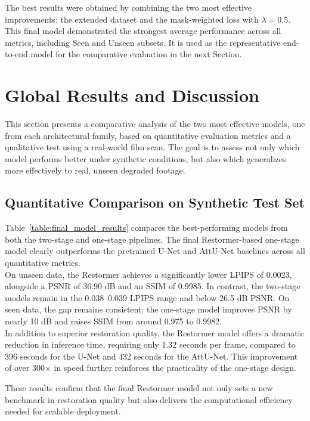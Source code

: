 \documentclass[10pt,a4paper,twocolumn,twoside]{article}
\begin{document}
The best results were obtained by combining the two most effective improvements: the extended dataset and the mask-weighted loss with $\lambda = 0.5$. This final model demonstrated the strongest average performance across all metrics, including Seen and Unseen subsets. It is used as the representative end-to-end model for the comparative evaluation in the next Section.

\section{Global Results and Discussion}
 This section presents a comparative analysis of the two most effective models, one from each architectural family, based on quantitative evaluation metrics and a qualitative test using a real-world film scan. The goal is to assess not only which model performs better under synthetic conditions, but also which generalizes more effectively to real, unseen degraded footage.
\subsection{Quantitative Comparison on Synthetic Test Set}
Table~\ref{table:final_model_results} compares the best-performing models from both the two-stage and one-stage pipelines. The final Restormer-based one-stage model clearly outperforms the pretrained U-Net and AttU-Net baselines across all quantitative metrics. \\
On unseen data, the Restormer achieves a significantly lower LPIPS of 0.0023, alongside a PSNR of 36.90 dB and an SSIM of 0.9985. In contrast, the two-stage models remain in the 0.038–0.039 LPIPS range and below 26.5 dB PSNR. On seen data, the gap remains consistent: the one-stage model improves PSNR by nearly 10 dB and raises SSIM from around 0.975 to 0.9982. \\
In addition to superior restoration quality, the Restormer model offers a dramatic reduction in inference time, requiring only 1.32 seconds per frame, compared to 396 seconds for the U-Net and 432 seconds for the AttU-Net. This improvement of over 300× in speed further reinforces the practicality of the one-stage design.

These results confirm that the final Restormer model not only sets a new benchmark in restoration quality but also delivers the computational efficiency needed for scalable deployment.
\end{document}
